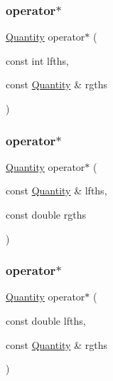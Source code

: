 \subsubsection{\texorpdfstring{operator$\ast$}{operator*}\hspace{0.1cm}{\footnotesize\ttfamily [3/5]}}
{\footnotesize\ttfamily \hyperlink{classmunits_1_1_quantity}{Quantity} operator$\ast$ (\begin{DoxyParamCaption}\item[{const int}]{lfths,  }\item[{const \hyperlink{classmunits_1_1_quantity}{Quantity} \&}]{rgths }\end{DoxyParamCaption})\hspace{0.3cm}{\ttfamily [friend]}}

\mbox{\label{classmunits_1_1_quantity_ab1bd381ef86466a48f2ed99d64a96141}} 
\subsubsection{\texorpdfstring{operator$\ast$}{operator*}\hspace{0.1cm}{\footnotesize\ttfamily [4/5]}}
{\footnotesize\ttfamily \hyperlink{classmunits_1_1_quantity}{Quantity} operator$\ast$ (\begin{DoxyParamCaption}\item[{const \hyperlink{classmunits_1_1_quantity}{Quantity} \&}]{lfths,  }\item[{const double}]{rgths }\end{DoxyParamCaption})\hspace{0.3cm}{\ttfamily [friend]}}

\mbox{\label{classmunits_1_1_quantity_a0f7ddd0457e20b83847135178d2d71f0}} 
\subsubsection{\texorpdfstring{operator$\ast$}{operator*}\hspace{0.1cm}{\footnotesize\ttfamily [5/5]}}
{\footnotesize\ttfamily \hyperlink{classmunits_1_1_quantity}{Quantity} operator$\ast$ (\begin{DoxyParamCaption}\item[{const double}]{lfths,  }\item[{const \hyperlink{classmunits_1_1_quantity}{Quantity} \&}]{rgths }\end{DoxyParamCaption})\hspace{0.3cm}{\ttfamily [friend]}}

